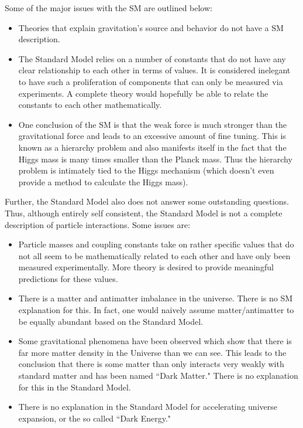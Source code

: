 Some of the major issues with the SM are outlined below:
\begin{itemize}
\item Theories that explain gravitation's source and behavior do not have a SM description.
\item The Standard Model relies on a number of constants that do not have any clear relationship to each other in terms of values. It is considered inelegant to have such a proliferation of components that can only be measured via experiments. A complete theory would hopefully be able to relate the constants to each other mathematically.
\item One conclusion of the SM is that the weak force is much stronger than the gravitational force and leads to an excessive amount of fine tuning. This is known as a hierarchy problem and also manifests itself in the fact that the Higgs mass is many times smaller than the Planck mass. Thus the hierarchy problem is intimately tied to the Higgs mechanism (which doesn't even provide a method to calculate the Higgs mass).
 \end{itemize}
 
 Further, the Standard Model also does not answer some outstanding questions. Thus, although entirely self consistent, the Standard Model is not a complete description of particle interactions. Some issues are:
 \begin{itemize}
 \item Particle masses and coupling constants take on rather specific values that do not all seem to be mathematically related to each other and have only been measured experimentally. More theory is desired to provide meaningful predictions for these values.
 \item There is a matter and antimatter imbalance in the universe. There is no SM explanation for this. In fact, one would naively assume matter/antimatter to be equally abundant based on the Standard Model.
 \item Some gravitational phenomena have been observed which show that there is far more matter density in the Universe than we can see. This leads to the conclusion that there is some matter than only interacts very weakly with standard matter and has been named ``Dark Matter." There is no explanation for this in the Standard Model.
 \item There is no explanation in the Standard Model for accelerating universe expansion, or the so called ``Dark Energy." 
  \end{itemize}

